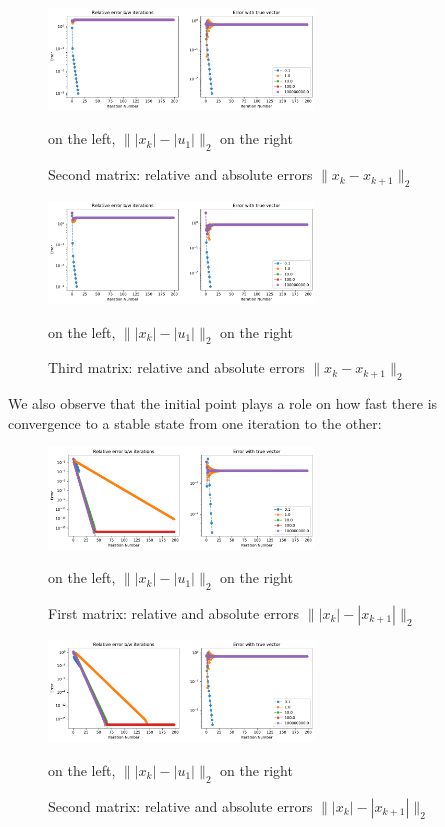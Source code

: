 \documentclass[12pt,twoside]{article}
\begin{document}
\begin{enumerate}
\begin{enumerate}
\begin{figure}[H]
	\centering
	\includegraphics[width=200pt]{figures/random_init_3.pdf}
	\caption{Second matrix: relative and absolute errors  $\| x_k - x_{k+1}\|_2$} on the left,  $\| |x_k| - |u_1| \|_2$ on the right
	\label{fig1}
\end{figure}

\begin{figure}[H]
	\centering
	\includegraphics[width=200pt]{figures/random_init_4.pdf}
	\caption{Third matrix: relative and absolute errors  $\| x_k - x_{k+1}\|_2$} on the left,  $\| |x_k| - |u_1| \|_2$ on the right
	\label{fig1}
\end{figure}

We also observe that the initial point plays a role on how fast there is convergence to a stable state from one iteration to the other:

\begin{figure}[H]
	\centering
	\includegraphics[width=200pt]{figures/random_init_2_abs_error.pdf}
	\caption{First matrix: relative and absolute errors  $\| |x_k| - |x_{k+1}| \|_2$} on the left,  $\| |x_k| - |u_1| \|_2$ on the right
	\label{fig1}
\end{figure}

\begin{figure}[H]
	\centering
	\includegraphics[width=200pt]{figures/random_init_3_abs_error.pdf}
	\caption{Second matrix: relative and absolute errors  $\| |x_k| - |x_{k+1}| \|_2$} on the left,  $\| |x_k| - |u_1| \|_2$ on the right
	\label{fig1}
\end{figure}


\end{enumerate}
\end{enumerate}
\end{document}

